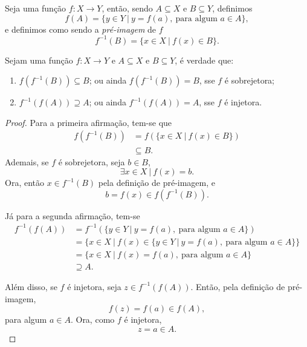 \documentclass[11pt,openany]{book}
\begin{document}
    \begin{definition}
    \label{def:pre_imagem}
        Seja uma função $f:X\rightarrow Y$, então, sendo $A \subseteq X$ e $B \subseteq Y$, definimos
        \[f(A) = \{y \in Y \ | \ y = f(a), \ \text{para algum $a \in A$}\},\]
        e definimos como sendo a \textit{pré-imagem} de $f$
        \[f^{-1}(B) = \{x \in X \ | \ f(x) \in B\}.\]
    \end{definition}
    
     \begin{lemma}
     \label{lemma:função_pre_imagem}
        Sejam uma função $f:X\rightarrow Y$ e $A \subseteq X$ e $B \subseteq Y$, é verdade que:
        \begin{enumerate}
            \item $f(f^{-1}(B)) \subseteq B$; ou ainda $f(f^{-1}(B)) = B$, sse $f$ é sobrejetora;
            \item $f^{-1}(f(A)) \supseteq A$; ou ainda $f^{-1}(f(A)) = A$, sse $f$ é injetora.
        \end{enumerate}
     \end{lemma}

     \begin{proof}
         Para a primeira afirmação, tem-se que
         \begin{align*}
             f(f^{-1}(B)) &= f(\{x \in X \ | \ f(x) \in B\})\\
             &\subseteq B.
         \end{align*}
        Ademais, se $f$ é sobrejetora, seja $b \in B$,
        \[\exists x \in X \ | \ f(x) = b.\]
        Ora, então $x \in f^{-1}(B)$ pela definição de pré-imagem, e
        \[b = f(x) \in f(f^{-1}(B)).\]
        

         Já para a segunda afirmação, tem-se
         \begin{align*}
             f^{-1}(f(A)) &= f^{-1}(\{y \in Y \ | \ y = f(a), \ \text{para algum $a \in A$}\})\\
             &= \{x \in X \ | \ f(x) \in \{y \in Y \ | \ y = f(a), \ \text{para algum $a \in A$}\}\}\\
             &= \{x \in X \ | \ f(x) = f(a), \ \text{para algum $a \in A$}\}\\
             &\supseteq A.
         \end{align*}

         Além disso, se $f$ é injetora, seja $z \in f^{-1}(f(A))$. Então, pela definição de pré-imagem,
         \[f(z) = f(a) \in f(A),\]
         para algum $a \in A$. Ora, como $f$ é injetora,
         \[z = a \in A.\]

         
     \end{proof}
\end{document}
